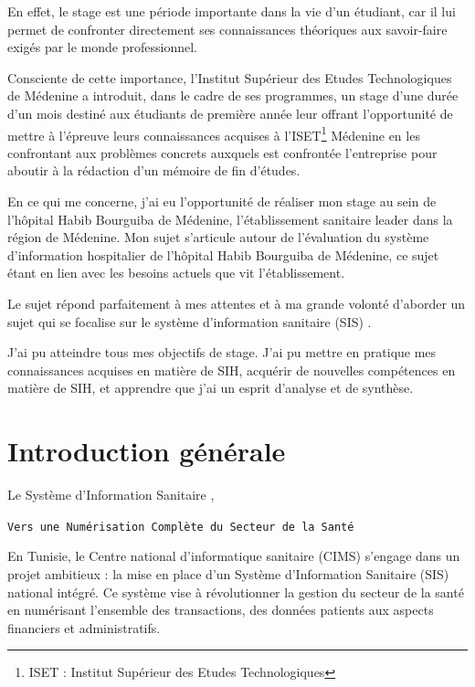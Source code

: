\documentclass[12pt]{rapportINPTCLOUD}
\begin{document}
	En effet, le stage est une période importante dans la vie d’un étudiant, car il lui permet de confronter directement ses connaissances théoriques aux savoir-faire exigés par le monde professionnel.
	
	Consciente de cette importance, l’Institut Supérieur des Etudes Technologiques de Médenine a introduit, dans le cadre de ses programmes, un stage d’une durée d’un mois destiné aux étudiants de première année leur offrant l’opportunité de mettre à l’épreuve leurs connaissances acquises à l’ISET\footnote{ISET : Institut Supérieur des Etudes Technologiques} Médenine en les confrontant aux problèmes concrets auxquels est confrontée l’entreprise pour aboutir à la rédaction d’un mémoire de fin d’études.
	
	En ce qui me concerne, j’ai eu l’opportunité de réaliser mon stage au sein de l’hôpital Habib Bourguiba de Médenine, l’établissement sanitaire leader dans la région de Médenine.
	Mon sujet s’articule autour de l’évaluation du système d’information hospitalier de l’hôpital Habib Bourguiba de Médenine, ce sujet étant en lien avec les besoins actuels que vit l’établissement.
	
	Le sujet répond parfaitement à mes attentes et à ma grande volonté d’aborder un sujet qui se focalise sur le système d’information sanitaire (SIS) . 
	
	J’ai pu atteindre tous mes objectifs de stage. J’ai pu mettre en pratique mes connaissances acquises en matière de SIH, acquérir de nouvelles compétences en matière de SIH, et apprendre que j’ai un esprit d’analyse et de synthèse.
	\newpage
	\setcounter{page}{1}
	\chapter*{Introduction générale}
		\begin{center}

		Le Système d'Information Sanitaire ,
	\end{center}
	\begin{center}
		\texttt{Vers une Numérisation Complète du Secteur de la Santé}
	\end{center} 
	
	En Tunisie, le Centre national d'informatique sanitaire (CIMS) s'engage dans un projet ambitieux : la mise en place d'un Système d'Information Sanitaire (SIS) national intégré. Ce système vise à révolutionner la gestion du secteur de la santé en numérisant l'ensemble des transactions, des données patients aux aspects financiers et administratifs.\\
	
\end{document}
